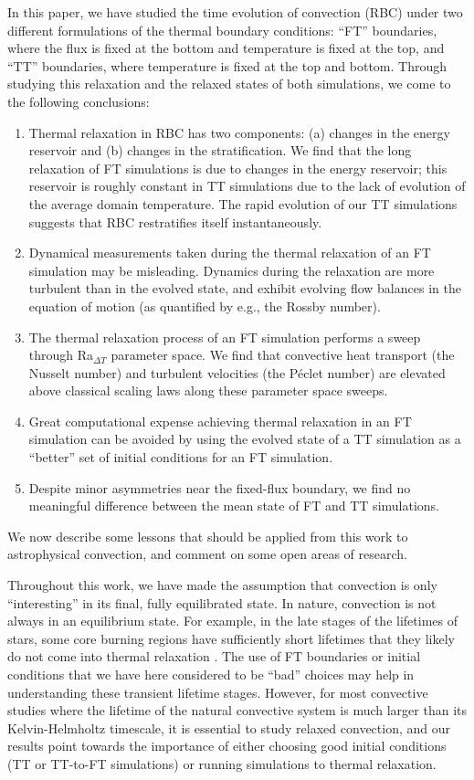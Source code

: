 In this paper, we have studied the time evolution of \RB convection (RBC) under two different formulations of the thermal boundary conditions: ``FT'' boundaries, where the flux is fixed at the bottom and temperature is fixed at the top, and ``TT'' boundaries, where temperature is fixed at the top and bottom.
Through studying this relaxation and the relaxed states of both simulations, we come to the following conclusions:
\begin{enumerate}
\item Thermal relaxation in RBC has two components: (a) changes in the energy reservoir and (b) changes in the stratification.
We find that the long relaxation of FT simulations is due to changes in the energy reservoir; this reservoir is roughly constant in TT simulations due to the lack of evolution of the average domain temperature.
The rapid evolution of our TT simulations suggests that RBC restratifies itself instantaneously.
\item Dynamical measurements taken during the thermal relaxation of an FT simulation may be misleading.
Dynamics during the relaxation are more turbulent than in the evolved state, and exhibit evolving flow balances in the equation of motion (as quantified by e.g., the Rossby number).
\item The thermal relaxation process of an FT simulation performs a sweep through Ra$_{\Delta T}$ parameter space.
We find that convective heat transport (the Nusselt number) and turbulent velocities (the P\'{e}clet number) are elevated above classical scaling laws along these parameter space sweeps.
\item Great computational expense achieving thermal relaxation in an FT simulation can be avoided by using the evolved state of a TT simulation as a ``better'' set of initial conditions for an FT simulation.
\item Despite minor asymmetries near the fixed-flux boundary, we find no meaningful difference between the mean state of FT and TT simulations.
\end{enumerate}
We now describe some lessons that should be applied from this work to astrophysical convection, and comment on some open areas of research.

Throughout this work, we have made the assumption that convection is only ``interesting'' in its final, fully equilibrated state.
In nature, convection is not always in an equilibrium state.
For example, in the late stages of the lifetimes of stars, some core burning regions have sufficiently short lifetimes that they likely do not come into thermal relaxation \citep{clarkson&all2018, andrassy&all2020}.
The use of FT boundaries or initial conditions that we have here considered to be ``bad'' choices may help in understanding these transient lifetime stages.
However, for most convective studies where the lifetime of the natural convective system is much larger than its Kelvin-Helmholtz timescale, it is essential to study relaxed convection, and our results point towards the importance of either choosing good initial conditions (TT or TT-to-FT simulations) or running simulations to thermal relaxation.

